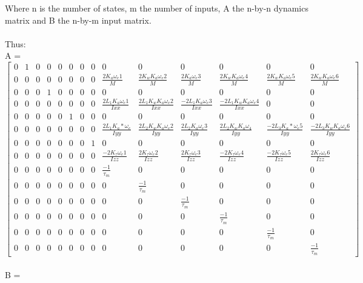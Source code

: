 \documentclass[12pt,a4paper,twoside]{report}
\begin{document}
				Where n is the number of states, m the number of inputs, A the n-by-n dynamics matrix and B the n-by-m input matrix.
				\\ \\
				Thus:
				\\
				\setcounter{MaxMatrixCols}{15}
				A = 
				\begin{equation}
					\begin{bmatrix}
						0&1&0&0&0&0&0&0&0&0&0&0&0&0\\
						0&0&0&0&0&0&0&0&\frac{2K_a\omega_e1}{M}&\frac{2K_wK_a\omega_e2}{M}&\frac{2K_a\omega_e3}{M}&\frac{2K_wK_a\omega_e4}{M}&\frac{2K_wK_a\omega_e5}{M}&\frac{2K_wK_a\omega_e6}{M}\\
						0&0&0&1&0&0&0&0&0&0&0&0&0&0\\
						0&0&0&0&0&0&0&0&\frac{2L_1K_a\omega_e1}{Ixx}&\frac{2L_1K_wK_a\omega_e2}{Ixx}& \frac{-2L_1K_a\omega_e3}{Ixx}&\frac{-2L_1K_wK_a\omega_e4}{Ixx}&0&0\\
						0&0&0&0&0&1&0&0&0&0&0&0&0&0\\
						0&0&0&0&0&0&0&0&\frac{2L_1K_a*\omega_e}{Iyy}&\frac{2L_2K_wK_a\omega_e2}{Iyy}& \frac{2L_2K_a\omega_e3}{Iyy}&\frac{2L_2K_wK_a\omega_4}{Iyy}&\frac{-2L_3K_a*\omega_e5}{Iyy}&\frac{-2L_3K_wK_a\omega_e6}{Iyy}\\
						0&0&0&0&0&0&0&1&0&0&0&0&0&0\\
						0&0&0&0&0&0&0&0&\frac{-2K_\tau\omega_e1}{Izz}&\frac{2K_\tau\omega_e2}{Izz}&\frac{2K_\tau\omega_e3}{Izz}&\frac{-2K_\tau\omega_e4}{Izz}&\frac{-2K_\tau\omega_e5}{Izz}&\frac{2K_\tau\omega_e6}{Izz}\\
						0&0&0&0&0&0&0&0&\frac{-1}{\tau_m}&0&0&0&0&0\\
						0&0&0&0&0&0&0&0&0&\frac{-1}{\tau_m}&0&0&0&0\\
						0&0&0&0&0&0&0&0&0&0&\frac{-1}{\tau_m}&0&0&0\\
						0&0&0&0&0&0&0&0&0&0&0&\frac{-1}{\tau_m}&0&0\\
						0&0&0&0&0&0&0&0&0&0&0&0&\frac{-1}{\tau_m}&0\\
						0&0&0&0&0&0&0&0&0&0&0&0&0&\frac{-1}{\tau_m}
					\end{bmatrix}
				\end{equation}
				\\
				B = 
\end{document}
